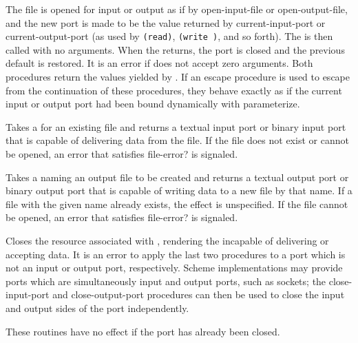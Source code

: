 \begin{entry}{%
}

The file is opened for input or output
as if by {\cf open-input-file} or {\cf open-output-file}, 
and the new port is made to be the value returned by
{\cf current-input-port} or {\cf current-output-port}
(as used by {\tt (read)}, {\tt (write )}, and so forth).
The  is then called with no arguments.  When the  returns,
the port is closed and the previous default is restored.
It is an error if  does not accept zero arguments.
Both procedures return the values yielded by .
If an escape procedure
is used to escape from the continuation of these procedures, they
behave exactly as if the current input or output port had been bound
dynamically with {\cf parameterize}.


\end{entry}


\begin{entry}{%
}
 
Takes a  for an existing file and returns a textual
input port or binary input port that is capable of delivering data from the
file.  If the file does not exist or cannot be opened, an error that satisfies {\cf file-error?} is signaled.

\end{entry}


\begin{entry}{%
}

Takes a  naming an output file to be created and returns a
textual output port or binary output port that is capable of writing
data to a new file by that name.
If a file with the given name already exists,
the effect is unspecified.
If the file cannot be opened,
an error that satisfies {\cf file-error?} is signaled.

\end{entry}


\begin{entry}{%
}

Closes the resource associated with , rendering the 
incapable of delivering or accepting data.  
It is an error
to apply the last two procedures to a port which is not an input
or output port, respectively.
Scheme implementations may provide ports which are simultaneously
input and output ports, such as sockets; the {\cf close-input-port}
and {\cf close-output-port} procedures can then be used to close the
input and output sides of the port independently.

These routines have no effect if the port has already been closed.


\end{entry}

